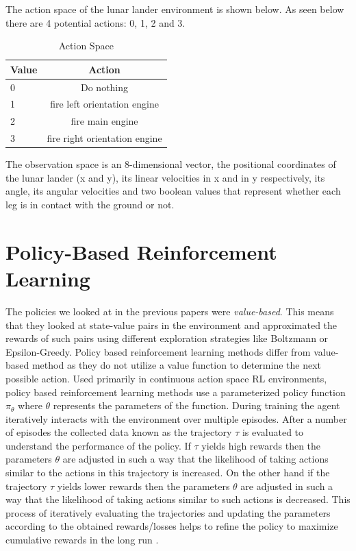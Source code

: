\documentclass{article}
\begin{document}
The action space of the lunar lander environment is shown below. 
As seen below there are 4 potential actions: 0, 1, 2 and 3. 

\begin{table}[htbp]
\centering
\begin{tabular}{|l|c|}
\hline
\textbf{Value} & \textbf{Action} \\
\hline
0  & Do nothing \\
\hline
1 & fire left orientation engine \\
\hline
2  & fire main engine \\
\hline
3 & fire right orientation engine  \\
\hline
\end{tabular}
\caption{Action Space}
\label{tab:hyper-parameters}
\end{table}

The observation space is an 8-dimensional vector, the positional coordinates of the lunar lander (x and y), its linear velocities in x and in y respectively, its angle, its angular velocities and two boolean values that represent whether each leg is in contact with the ground or not. 

\section{Policy-Based Reinforcement Learning}
The policies we looked at in the previous papers were \emph{value-based}. This means that they looked at state-value pairs in the environment and approximated the rewards of such pairs using different exploration strategies like Boltzmann or Epsilon-Greedy. Policy based reinforcement learning methods differ from value-based method as they do not utilize a value function to determine the next possible action. Used primarily in  continuous action space RL environments, policy based reinforcement learning methods use a parameterized policy function $\pi_\theta$ where $\theta$ represents the parameters of the function.\newline 
During training the agent iteratively interacts with the environment over multiple episodes. After a number of episodes the collected data known as the trajectory $\tau$ is evaluated to understand the performance of the policy. If $\tau$ yields high rewards then the parameters $\theta$ are adjusted in such a way that the likelihood of taking actions similar to the actions in this trajectory is increased. On the other hand if the trajectory $\tau$ yields lower rewards then the parameters $\theta$ are adjusted in such a way that the likelihood of taking actions similar to such actions is decreased. This process of iteratively evaluating the trajectories and updating the parameters according to the obtained rewards/losses helps to refine the policy to maximize cumulative rewards in the long run \cite{plaat-deeprl}. \newline
\end{document}

